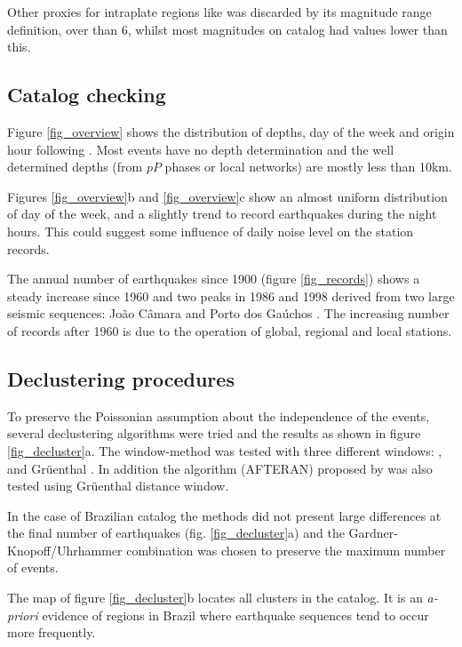\documentclass[draft, grl]{agutex}
\begin{document}
\begin{article}
Other proxies for intraplate regions like \citet{scordilis_2006} was discarded by its magnitude range definition, over than 6, whilst most magnitudes on \citet{bsb_2014} catalog had values lower than this.


\subsection{Catalog checking}

Figure \ref{fig_overview} shows the distribution of depths, day of the week and origin hour following \citet{gulia_2012}. Most events have no depth determination and the well determined depths (from $pP$ phases or local networks) are mostly less than 10km.

Figures \ref{fig_overview}b and \ref{fig_overview}c show an almost uniform distribution of day of the week, and a slightly trend to record earthquakes during the night hours. This could suggest some influence of daily noise level on the station records.

The annual number of earthquakes since 1900 (figure \ref{fig_records}) shows a steady increase since 1960 and two peaks in 1986 and 1998 derived from two large seismic sequences: João Câmara \citep{takeya_1989} and Porto dos Gaúchos \citep{barros_2009}. The increasing number of records after 1960 is due to the operation of global, regional and local stations.



\subsection{Declustering procedures}

To preserve the Poissonian assumption about the independence of the events, several declustering algorithms were tried and the results as shown in figure \ref{fig_decluster}a. The window-method \citep{gardner_1974} was tested with three different windows: \citet{gardner_1974}, \citet{uhrhammer_1986} and Gr\"uenthal \citep{van_stiphout_2012}.
In addition the algorithm (AFTERAN) proposed by \citet{musson_1999} was also tested using Gr\"uenthal distance window.

In the case of Brazilian catalog the methods did not present large differences at the final number of earthquakes (fig. \ref{fig_decluster}a) and the Gardner-Knopoff/Uhrhammer combination was chosen to preserve the maximum number of events.

The map of figure \ref{fig_decluster}b locates all clusters in the catalog. It is an \emph{a-priori} evidence of regions in Brazil where  earthquake sequences tend to occur more frequently.




\end{article}
\end{document}
